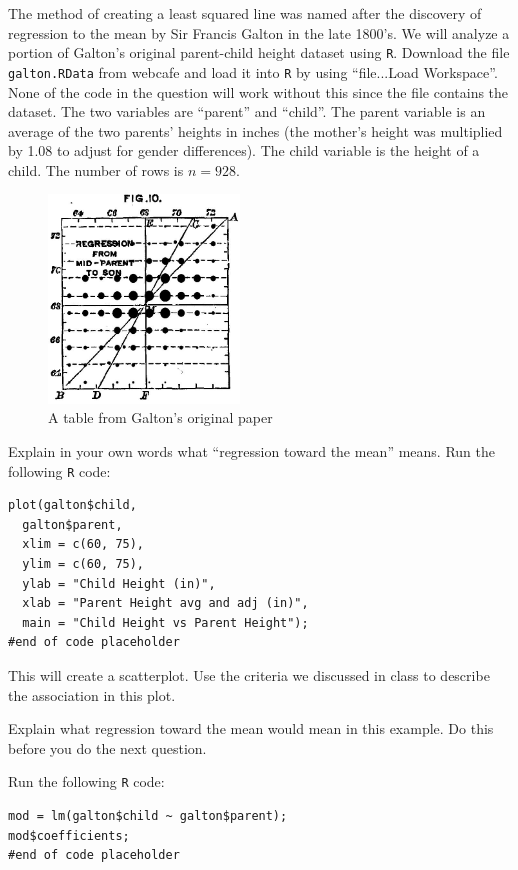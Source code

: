 \documentclass[12pt]{article}
\begin{document}
\problem The method of creating a least squared line was named after the discovery of regression to the mean by Sir Francis Galton in the late 1800's. We will analyze a portion of Galton's original parent-child height dataset using \texttt{R}. Download the file \texttt{galton.RData} from webcafe and load it into \texttt{R} by using ``file...Load Workspace''. None of the code in the question will work without this since the file contains the dataset. The two variables are ``parent'' and ``child''. The parent variable is an average of the two parents' heights in inches (the mother's height was multiplied by 1.08 to adjust for gender differences). The child variable is the height of a child. The number of rows is $n=928$.

\begin{figure}[htp]
\centering
\includegraphics[width=2in,height=2.18in]{galton.jpg}
\caption{A table from Galton's original paper}
\end{figure}
\FloatBarrier

\benum
\easysubproblem Explain in your own words what ``regression toward the mean'' means.
\easysubproblem Run the following \texttt{R} code:

\begin{verbatim}
plot(galton$child, 
  galton$parent, 
  xlim = c(60, 75),
  ylim = c(60, 75),
  ylab = "Child Height (in)", 
  xlab = "Parent Height avg and adj (in)", 
  main = "Child Height vs Parent Height");
#end of code placeholder
\end{verbatim}

This will create a scatterplot. Use the criteria we discussed in class to describe the association in this plot.

\easysubproblem Explain what regression toward the mean would mean in this example. Do this before you do the next question.

\easysubproblem Run the following \texttt{R} code:

\begin{verbatim}
mod = lm(galton$child ~ galton$parent);
mod$coefficients;
#end of code placeholder
\end{verbatim}
\end{document}
